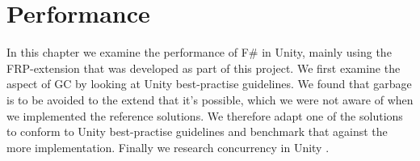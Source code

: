 \chapter{Performance}
In this chapter we examine the performance of F\# in Unity, mainly using the \gls{FRP}-extension that was developed as part of this project. We first examine the aspect of \gls{GC} by looking at Unity best-practise guidelines. We found that garbage is to be avoided to the extend that it's possible, which we were not aware of when we implemented the reference solutions. We therefore adapt one of the solutions to conform to Unity best-practise guidelines and benchmark that against the more  implementation. Finally we research concurrency in Unity .


